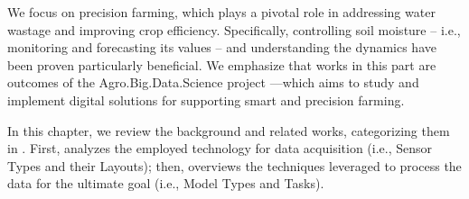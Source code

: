 
We focus on precision farming, which plays a pivotal role in addressing water
wastage and improving crop efficiency.
Specifically, controlling soil moisture -- i.e., monitoring and forecasting its values -- and understanding the dynamics have been proven particularly beneficial.
We emphasize that works in this part are outcomes of the Agro.Big.Data.Science project \cite{ABDS}---which aims to study and implement digital solutions for supporting smart and precision farming.

In this chapter, we review the background and related works, categorizing them in .
First,  analyzes the employed technology for data acquisition (i.e., Sensor Types and their Layouts); then,  overviews the techniques leveraged to process the data for the ultimate goal (i.e., Model Types and Tasks).


